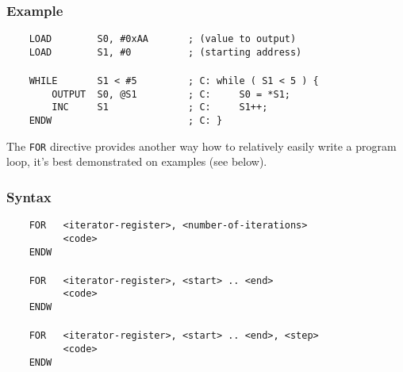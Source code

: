         \subsubsection{Example}
            \verb'    LOAD        S0, #0xAA       ; (value to output)'\\
            \verb'    LOAD        S1, #0          ; (starting address)'\\
            \verb''\\
            \verb'    WHILE       S1 < #5         ; C: while ( S1 < 5 ) {'\\
            \verb'        OUTPUT  S0, @S1         ; C:     S0 = *S1;'\\
            \verb'        INC     S1              ; C:     S1++;'\\
            \verb'    ENDW                        ; C: }'

    \clearpage
        The \texttt{FOR} directive provides another way how to relatively easily write a program loop, it's best demonstrated on examples (see below).

        \subsubsection{Syntax}
            \verb'    FOR   <iterator-register>, <number-of-iterations>'\\
            \verb'          <code>'\\
            \verb'    ENDW'\\
            \verb''\\
            \verb'    FOR   <iterator-register>, <start> .. <end>'\\
            \verb'          <code>'\\
            \verb'    ENDW'\\
            \verb''\\
            \verb'    FOR   <iterator-register>, <start> .. <end>, <step>'\\
            \verb'          <code>'\\
            \verb'    ENDW'

